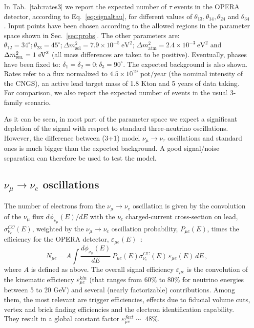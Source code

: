 \documentclass[12pt]{elsart}
\newcommand{\eVq}{\ensuremath{\text{eV}^2}}
\newcommand{\Dmq}{\Delta m^2}
\newcommand{\Sol}{\text{sol}}
\newcommand{\Atm}{\text{atm}}
\newcommand{\Sbl}{\textsc{sbl}}
\begin{document}
In Tab.~\ref{tab:rates3} we report the expected number of $\tau$
events in the OPERA detector, according to Eq.~\eqref{eq:signaltau},
for different values of $\theta_{13}, \theta_{14}, \theta_{24}$ and
$\theta_{34}$. Input points have been chosen according to the allowed
regions in the parameter space shown in Sec.~\ref{sec:probs}. The
other parameters are: $\theta_{12} = 34^\circ; \theta_{23} = 45^\circ;
\Dmq_\Sol = 7.9 \times 10^{-5}~\eVq$; $\Dmq_\Atm = 2.4 \times
10^{-3}~\eVq$ and $\Dmq_\Sbl = 1~\eVq$ (all mass differences are taken
to be positive).  Eventually, phases have been fixed to: $\delta_1 =
\delta_2 = 0; \delta_3 = 90^\circ$. The expected background is also
shown. Rates refer to a flux normalized to $4.5 \times 10^{19}$
pot/year (the nominal intensity of the CNGS), an active lead target
mass of 1.8 Kton and 5 years of data taking. For comparison, we also
report the expected number of events in the usual 3-family scenario.

As it can be seen, in most part of the parameter space we expect a
significant depletion of the signal with respect to standard
three-neutrino oscillations. However, the difference between (3+1)
model $\nu_\mu \to \nu_\tau$ oscillations and standard ones is much
bigger than the expected background. A good signal/noise separation
can therefore be used to test the model.

\subsection{$\nu_\mu \to \nu_e$ oscillations}
\label{sec:appe}

The number of electrons from the $\nu_\mu \to \nu_e$ oscillation is
given by the convolution of the $\nu_\mu$ flux $ d \phi_{\nu_{\mu}}(E)
/ dE$ with the $\nu_e$ charged-current cross-section on lead, 
$\sigma_{\nu_{e}}^{CC}(E)$, weighted by the $\nu_\mu \to \nu_e$
oscillation probability, $P_{\mu e}(E)$, times the efficiency for the
OPERA detector, $\varepsilon_{\mu e} (E)$~\cite{Komatsu:2002sz}:
%
\begin{equation}
    \label{eq:signale}
    N_{\mu e} = A \int \frac{ d\phi_{\nu_{\mu}}(E)}{dE} \,
    P_{\mu e}(E) \sigma_{\nu_{e}}^{CC}(E) \,
    \varepsilon_{\mu e}(E) \, dE \,,
\end{equation}
%
where $A$ is defined as above.  The overall signal efficiency $
\varepsilon_{\mu e}$ is the convolution of the kinematic efficiency
$\varepsilon_{\mu e}^{kin}$ (that ranges from 60\% to 80\% for
neutrino energies between 5 to 20 GeV) and several (nearly
factorizable) contributions.  Among them, the most relevant are
trigger efficiencies, effects due to fiducial volume cuts, vertex and
brick finding efficiencies and the electron identification capability.
They result in a global constant factor $\varepsilon_{\mu e}^{fact}
\sim$ 48\%.
\end{document}
